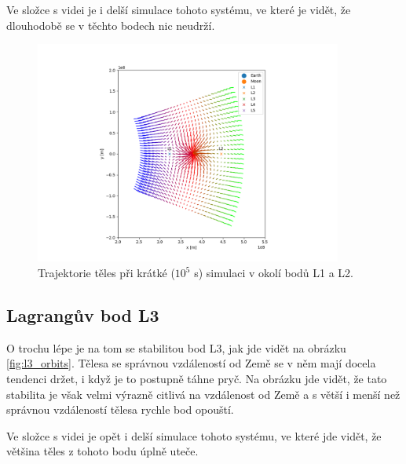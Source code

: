 \documentclass[a4paper,11pt]{article}
\begin{document}
Ve složce s videi je i delší simulace tohoto systému, ve které je vidět, že dlouhodobě se v těchto bodech nic neudrží.

\begin{figure}[h!]
    \centering
    \includegraphics[width=0.9\textwidth]{l12_orbits.png}

    \caption{Trajektorie těles při krátké ($10^5$ s) simulaci v okolí bodů L1 a L2.}
    \label{fig:l12_orbits}
\end{figure}

\subsection{Lagrangův bod L3}

O trochu lépe je na tom se stabilitou bod L3, jak jde vidět na obrázku \ref{fig:l3_orbits}.
Tělesa se správnou vzdáleností od Země se v něm mají docela tendenci držet, i když je to postupně
táhne pryč. Na obrázku jde vidět, že tato stabilita je však velmi výrazně citlivá na vzdálenost od Země
a s větší i menší než správnou vzdáleností tělesa rychle bod opouští.

Ve složce s videi je opět i delší simulace tohoto systému, ve které jde vidět, že většina těles
z tohoto bodu úplně uteče.
\end{document}
